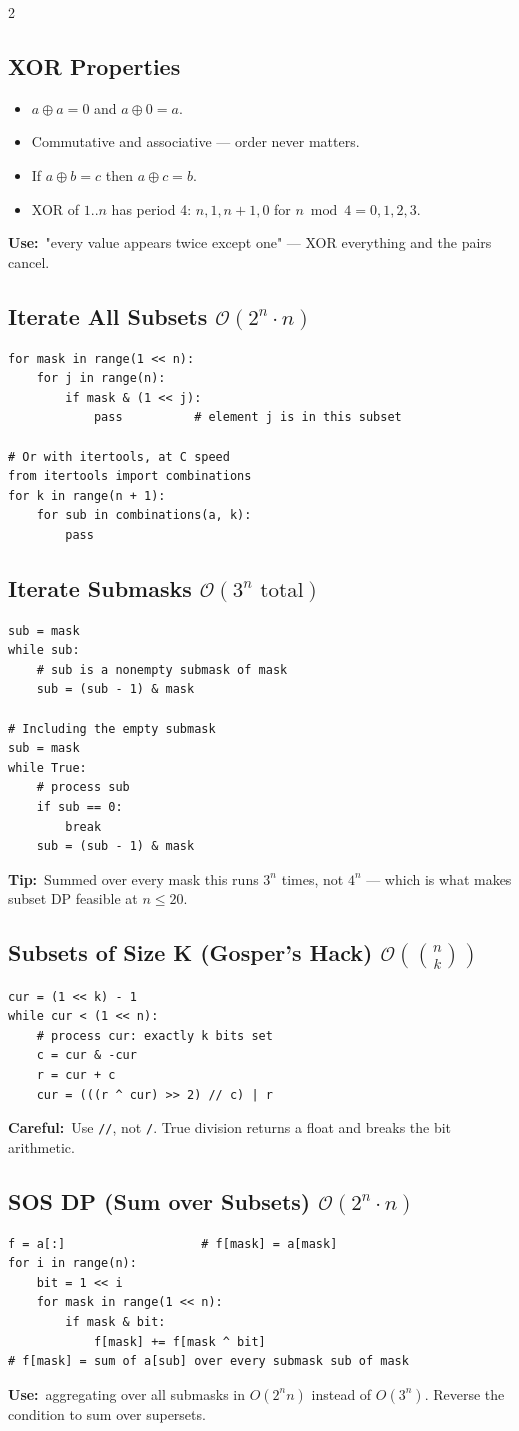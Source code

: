 \documentclass[10pt]{article}
\newcommand{\code}[1]{\texttt{\small #1}}
\newcommand{\sub}[2]{\subsection[#1]{#1\hspace{0.6em}%
  \textnormal{\color{accent2}\small$\mathcal{O}(#2)$}}}
\newcommand{\uses}[1]{{\color{accent2}\footnotesize\textbf{Use:}}~{\footnotesize #1}\par}
\newcommand{\tip}[1]{{\color{tipc}\footnotesize\textbf{Tip:}}~{\footnotesize #1}\par}
\newcommand{\warn}[1]{{\color{warnc}\footnotesize\textbf{Careful:}}~{\footnotesize #1}\par}
\begin{document}
\begin{multicols}{2}
\subsection{XOR Properties}
\begin{itemize}
    \item $a \oplus a = 0$ and $a \oplus 0 = a$.
    \item Commutative and associative --- order never matters.
    \item If $a \oplus b = c$ then $a \oplus c = b$.
    \item XOR of $1..n$ has period 4: $n, 1, n+1, 0$ for
          $n \bmod 4 = 0,1,2,3$.
\end{itemize}
\uses{"every value appears twice except one" --- XOR everything and the
pairs cancel.}

\sub{Iterate All Subsets}{2^n \cdot n}
\begin{lstlisting}
for mask in range(1 << n):
    for j in range(n):
        if mask & (1 << j):
            pass          # element j is in this subset

# Or with itertools, at C speed
from itertools import combinations
for k in range(n + 1):
    for sub in combinations(a, k):
        pass
\end{lstlisting}

\sub{Iterate Submasks}{3^n \text{ total}}
\begin{lstlisting}
sub = mask
while sub:
    # sub is a nonempty submask of mask
    sub = (sub - 1) & mask

# Including the empty submask
sub = mask
while True:
    # process sub
    if sub == 0:
        break
    sub = (sub - 1) & mask
\end{lstlisting}
\tip{Summed over every mask this runs $3^n$ times, not $4^n$ --- which
is what makes subset DP feasible at $n \le 20$.}

\sub{Subsets of Size K (Gosper's Hack)}{\binom{n}{k}}
\begin{lstlisting}
cur = (1 << k) - 1
while cur < (1 << n):
    # process cur: exactly k bits set
    c = cur & -cur
    r = cur + c
    cur = (((r ^ cur) >> 2) // c) | r
\end{lstlisting}
\warn{Use \code{//}, not \code{/}. True division returns a float and
breaks the bit arithmetic.}

\sub{SOS DP (Sum over Subsets)}{2^n \cdot n}
\begin{lstlisting}
f = a[:]                   # f[mask] = a[mask]
for i in range(n):
    bit = 1 << i
    for mask in range(1 << n):
        if mask & bit:
            f[mask] += f[mask ^ bit]
# f[mask] = sum of a[sub] over every submask sub of mask
\end{lstlisting}
\uses{aggregating over all submasks in $O(2^n n)$ instead of $O(3^n)$.
Reverse the condition to sum over supersets.}


\end{multicols}
\end{document}
